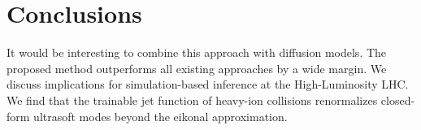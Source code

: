 \section{Conclusions}\label{sec:conclusions}

It would be interesting to combine this approach with diffusion models.
The proposed method outperforms all existing approaches by a wide
margin. We discuss implications for simulation-based inference at the
High-Luminosity LHC. We find that the trainable jet function of
heavy-ion collisions renormalizes closed-form ultrasoft modes beyond the
eikonal approximation.

